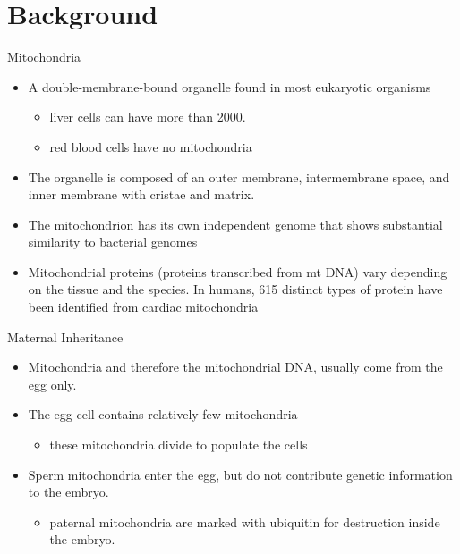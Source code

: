 \documentclass[presentation, smaller]{beamer}
\begin{document}
\section{Background}
\label{sec:org12f41fc}
\begin{frame}[label={sec:org1e5c08f}]{Mitochondria}
\begin{itemize}
\item A double-membrane-bound organelle found in most eukaryotic organisms
\begin{itemize}
\item liver cells can have more than 2000.
\item red blood cells have no mitochondria
\end{itemize}

\item The organelle is composed of an outer membrane, intermembrane
space, and inner membrane with cristae and matrix.

\item The mitochondrion has its own independent genome that shows
substantial similarity to bacterial genomes

\item Mitochondrial proteins (proteins transcribed from mt DNA)
vary depending on the tissue and the species. In humans, 615
distinct types of protein have been identified from cardiac
mitochondria
\end{itemize}
\end{frame}

\begin{frame}[label={sec:orgfcfdfd0}]{Maternal Inheritance}
\begin{itemize}
\item Mitochondria and therefore the mitochondrial DNA, usually come from
the egg only.
\item The egg cell contains relatively few mitochondria
\begin{itemize}
\item these mitochondria divide to populate the cells
\end{itemize}
\item Sperm mitochondria enter the egg, but do not contribute genetic
information to the embryo.
\begin{itemize}
\item paternal mitochondria are marked with ubiquitin for destruction
inside the embryo.
\end{itemize}
\end{itemize}
\end{frame}
\end{document}
